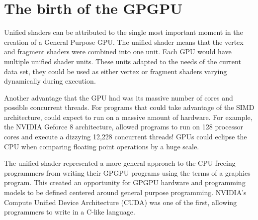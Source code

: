 \section*{The birth of the GPGPU}

Unified shaders can be attributed to the single most important moment in the creation of a General Purpose GPU. The unified shader means that the vertex and fragment shaders were combined into one unit. Each GPU would have multiple unified shader units. These units adapted to the needs of the current data set, they could be used as either vertex or fragment shaders varying dynamically during execution. 

Another advantage that the GPU had was its massive number of cores and possible concurrent threads. For programs that could take advantage of the SIMD architecture, could expect to run on a massive amount of hardware. For example, the NVIDIA Geforce 8 architecture, allowed programs to run on 128 processor cores and execute a dizzying 12,228 concurrent threads! GPUs could eclipse the CPU when comparing floating point operations by a huge scale. 

The unified shader represented a more general approach to the CPU freeing programmers from writing their GPGPU programs using the terms of a graphics program. This created an opportunity for GPGPU hardware and programming models to be defined centered around general purpose programming. NVIDIA's Compute Unified Device Architecture (CUDA) was one of the first, allowing programmers to write in a C-like language. 













